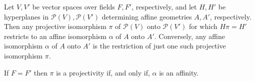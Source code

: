 Let $V, V'$ be vector spaces over fields $F, F'$, respectively, and let $H, H'$ be hyperplanes in $\mathcal{P}(V), \mathcal{P}(V')$ determining affine geometries $A, A'$, respectively. Then any projective isomorphism $\pi$ of $\mathcal{P}(V)$ onto $\mathcal{P}(V')$ for which $H\pi = H'$ restricts to an affine isomorphism $\alpha$ of $A$ onto $A'$. Conversely, any affine isomorphism $\alpha$ of $A$ onto $A'$ is the restriction of just one such projective isomorphism $\pi$.

If $F = F'$ then $\pi$ is a projectivity if, and only if, $\alpha$ is an affinity.
